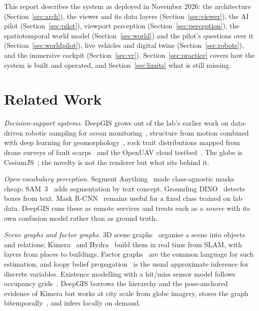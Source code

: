\documentclass[journal]{IEEEtran}
\begin{document}
This report describes the system as deployed in November 2026: the architecture
(Section~\ref{sec:arch}), the viewer and its data layers (Section~\ref{sec:viewer}), the AI pilot
(Section~\ref{sec:pilot}), viewport perception (Section~\ref{sec:perception}), the spatiotemporal
world model (Section~\ref{sec:world}) and the pilot's questions over it
(Section~\ref{sec:worldpilot}), live vehicles and digital twins (Section~\ref{sec:robots}), and the
immersive cockpit (Section~\ref{sec:vr}). Section~\ref{sec:practice} covers how the system is
built and operated, and Section~\ref{sec:limits} what is still missing.

\section{Related Work}
\label{sec:related}

\emph{Decision-support systems.} DeepGIS grows out of the lab's earlier work on data-driven
robotic sampling for ocean monitoring~\cite{das2015ijrr}, structure from motion combined with
deep learning for geomorphology~\cite{chen2020iros}, rock trait distributions mapped from drone
surveys of fault scarps~\cite{chen2023espl} and the OpenUAV cloud testbed~\cite{anand2019openuav}. The globe
is CesiumJS~\cite{cesium}; the novelty is not the renderer but what sits behind it.

\emph{Open-vocabulary perception.} Segment Anything~\cite{kirillov2023sam} made class-agnostic
masks cheap; SAM~3~\cite{carion2025sam3} adds segmentation by text concept. Grounding
DINO~\cite{liu2024gdino} detects boxes from text. Mask R-CNN~\cite{he2017maskrcnn} remains
useful for a fixed class trained on lab data. DeepGIS runs these as remote services and treats
each as a \emph{source} with its own confusion model rather than as ground truth.

\emph{Scene graphs and factor graphs.} 3D scene graphs~\cite{armeni2019sg} organise a scene into
objects and relations; Kimera~\cite{rosinol2021kimera} and Hydra~\cite{hughes2022hydra} build them
in real time from SLAM, with layers from places to buildings. Factor graphs~\cite{kschischang2001,
dellaert2017} are the common language for such estimation, and loopy belief
propagation~\cite{murphy1999loopy} is the usual approximate inference for discrete variables.
Existence modelling with a hit/miss sensor model follows occupancy grids~\cite{moravec1985}.
DeepGIS borrows the hierarchy and the pose-anchored evidence of Kimera but works at city scale from
globe imagery, stores the graph bitemporally~\cite{snodgrass1999}, and infers locally on demand.
\end{document}
